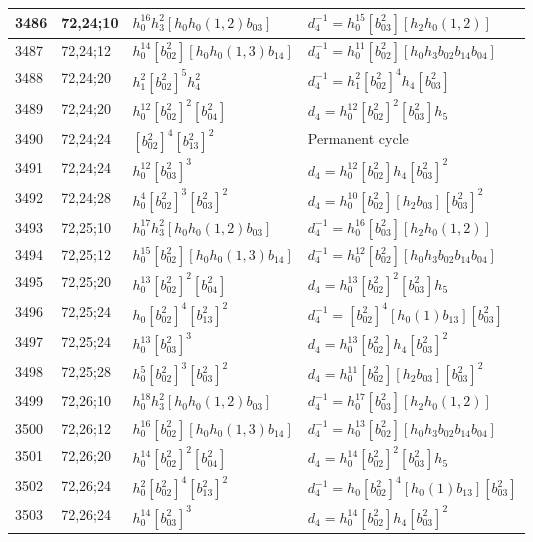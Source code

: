\documentclass{article}
\begin{document}
\begin{longtable}{|l|l|>{\raggedright\arraybackslash}p{6cm}|>{\raggedright\arraybackslash}p{6cm}|}
\hline
3486 & 72,24;10 & $h_0^{16}h_3^2[h_0h_0(1, 2)b_{03}]$ & $d_{4}^{-1}=h_0^{15}[b_{03}^2][h_2h_0(1, 2)]$\\
\hline
3487 & 72,24;12 & $h_0^{14}[b_{02}^2][h_0h_0(1, 3)b_{14}]$ & $d_{4}^{-1}=h_0^{11}[b_{02}^2][h_0h_3b_{02}b_{14}b_{04}]$\\
\hline
3488 & 72,24;20 & $h_1^2[b_{02}^2]^5h_4^2$ & $d_{4}^{-1}=h_1^2[b_{02}^2]^4h_4[b_{03}^2]$\\
3489 & 72,24;20 & $h_0^{12}[b_{02}^2]^2[b_{04}^2]$ &$d_{4}=h_0^{12}[b_{02}^2]^2[b_{03}^2]h_5$\\
\hline
3490 & 72,24;24 & $[b_{02}^2]^4[b_{13}^2]^2$ & Permanent cycle\\
3491 & 72,24;24 & $h_0^{12}[b_{03}^2]^3$ &$d_{4}=h_0^{12}[b_{02}^2]h_4[b_{03}^2]^2$\\
\hline
3492 & 72,24;28 & $h_0^4[b_{02}^2]^3[b_{03}^2]^2$ &$d_{4}=h_0^{10}[b_{02}^2][h_2b_{03}][b_{03}^2]^2$\\
\hline
3493 & 72,25;10 & $h_0^{17}h_3^2[h_0h_0(1, 2)b_{03}]$ & $d_{4}^{-1}=h_0^{16}[b_{03}^2][h_2h_0(1, 2)]$\\
\hline
3494 & 72,25;12 & $h_0^{15}[b_{02}^2][h_0h_0(1, 3)b_{14}]$ & $d_{4}^{-1}=h_0^{12}[b_{02}^2][h_0h_3b_{02}b_{14}b_{04}]$\\
\hline
3495 & 72,25;20 & $h_0^{13}[b_{02}^2]^2[b_{04}^2]$ &$d_{4}=h_0^{13}[b_{02}^2]^2[b_{03}^2]h_5$\\
\hline
3496 & 72,25;24 & $h_0[b_{02}^2]^4[b_{13}^2]^2$ & $d_{4}^{-1}=[b_{02}^2]^4[h_0(1)b_{13}][b_{03}^2]$\\
3497 & 72,25;24 & $h_0^{13}[b_{03}^2]^3$ &$d_{4}=h_0^{13}[b_{02}^2]h_4[b_{03}^2]^2$\\
\hline
3498 & 72,25;28 & $h_0^5[b_{02}^2]^3[b_{03}^2]^2$ &$d_{4}=h_0^{11}[b_{02}^2][h_2b_{03}][b_{03}^2]^2$\\
\hline
3499 & 72,26;10 & $h_0^{18}h_3^2[h_0h_0(1, 2)b_{03}]$ & $d_{4}^{-1}=h_0^{17}[b_{03}^2][h_2h_0(1, 2)]$\\
\hline
3500 & 72,26;12 & $h_0^{16}[b_{02}^2][h_0h_0(1, 3)b_{14}]$ & $d_{4}^{-1}=h_0^{13}[b_{02}^2][h_0h_3b_{02}b_{14}b_{04}]$\\
\hline
3501 & 72,26;20 & $h_0^{14}[b_{02}^2]^2[b_{04}^2]$ &$d_{4}=h_0^{14}[b_{02}^2]^2[b_{03}^2]h_5$\\
\hline
3502 & 72,26;24 & $h_0^2[b_{02}^2]^4[b_{13}^2]^2$ & $d_{4}^{-1}=h_0[b_{02}^2]^4[h_0(1)b_{13}][b_{03}^2]$\\
3503 & 72,26;24 & $h_0^{14}[b_{03}^2]^3$ &$d_{4}=h_0^{14}[b_{02}^2]h_4[b_{03}^2]^2$\\

\end{longtable}
\end{document}
